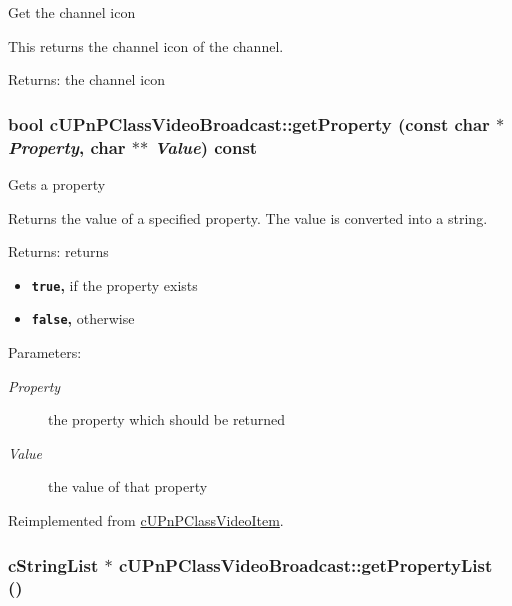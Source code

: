 Get the channel icon

This returns the channel icon of the channel.

\begin{Desc}
\item[Returns:]the channel icon \end{Desc}
\hypertarget{classcUPnPClassVideoBroadcast_e1d13a13de094337cea6be214c4da0f0}{
\subsubsection[{getProperty}]{\setlength{\rightskip}{0pt plus 5cm}bool cUPnPClassVideoBroadcast::getProperty (const char $\ast$ {\em Property}, \/  char $\ast$$\ast$ {\em Value}) const}}
\label{classcUPnPClassVideoBroadcast_e1d13a13de094337cea6be214c4da0f0}


Gets a property

Returns the value of a specified property. The value is converted into a string.

\begin{Desc}
\item[Returns:]returns\begin{itemize}
\item {\bf {\tt true},} if the property exists\item {\bf {\tt false},} otherwise \end{itemize}
\end{Desc}
\begin{Desc}
\item[Parameters:]
\begin{description}
\item[{\em Property}]the property which should be returned \item[{\em Value}]the value of that property \end{description}
\end{Desc}


Reimplemented from \hyperlink{classcUPnPClassVideoItem_94ab2ffcbe14abb63c680e6748e70ef1}{cUPnPClassVideoItem}.\hypertarget{classcUPnPClassVideoBroadcast_192f6a04c87fe8d56f99c71337cf0f68}{
\subsubsection[{getPropertyList}]{\setlength{\rightskip}{0pt plus 5cm}cStringList $\ast$ cUPnPClassVideoBroadcast::getPropertyList ()}}
\label{classcUPnPClassVideoBroadcast_192f6a04c87fe8d56f99c71337cf0f68}


